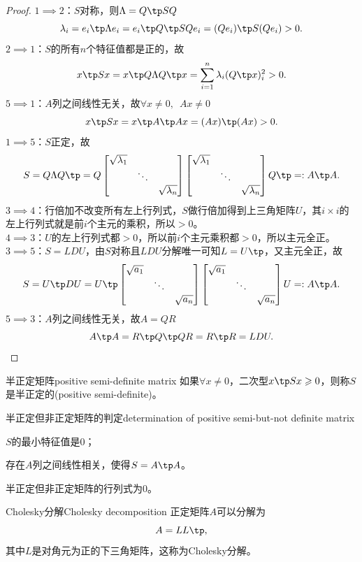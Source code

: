 \begin{proof}
	$1\implies 2$：$S$对称，则$\Lambda=Q\tp SQ$
	\[
		\lambda_i=e_i\tp \Lambda e_i=e_i\tp Q\tp SQe_i=(Qe_i)\tp S(Qe_i)>0.
	\]
	$2\implies 1$：$S$的所有$n$个特征值都是正的，故
	\[
		x\tp Sx=x\tp Q\Lambda Q\tp x=\sum_{i=1}^n\lambda_i(Q\tp x)^2_i>0.
	\]
	$5\implies 1$：$A$列之间线性无关，故$\forall x\neq 0,\enspace Ax\neq 0$
	\[
		x\tp Sx=x\tp A\tp Ax=(Ax)\tp(Ax)>0.
	\]
	$1\implies 5$：$S$正定，故
	\[
		S=Q\Lambda Q\tp=Q\begin{bmatrix}
			\sqrt{\lambda_1}\\ &\ddots\\ &&\sqrt{\lambda_n}
		\end{bmatrix}\begin{bmatrix}
			\sqrt{\lambda_1}\\ &\ddots\\ &&\sqrt{\lambda_n}
		\end{bmatrix}Q\tp=:A\tp A.
	\]
	$3\implies 4$：行倍加不改变所有左上行列式，$S$做行倍加得到上三角矩阵$U$，其$i\times i$的左上行列式就是前$i$个主元的乘积，所以$>0$。\\
	$4\implies 3$：$U$的左上行列式都$>0$，所以前$i$个主元乘积都$>0$，所以主元全正。\\
	$3\implies 5$：$S=LDU$，由$S$对称且$LDU$分解唯一可知$L=U\tp$，又主元全正，故
	\[
		S=U\tp DU=U\tp\begin{bmatrix}
			\sqrt{a_1}\\ &\ddots\\ &&\sqrt{a_n}
		\end{bmatrix}\begin{bmatrix}
			\sqrt{a_1}\\ &\ddots\\ &&\sqrt{a_n}
		\end{bmatrix}U=:A\tp A.
	\]
	$5\implies 3$：$A$列之间线性无关，故$A=QR$
	\[
		A\tp A=R\tp Q\tp QR=R\tp R=LDU.
		\qedhere
	\]
\end{proof}
\begin{definition}{半正定矩阵}{positive semi-definite matrix}
	如果$\forall x\neq 0$，二次型$x\tp Sx\geqslant 0$，则称$S$是半正定的(positive semi-definite)。
\end{definition}
\begin{theorem}{半正定但非正定矩阵的判定}{determination of positive semi-but-not definite matrix}
	\begin{compactenum}
		\item $S$的最小特征值是0；
		\item 存在$A$列之间线性相关，使得$S=A\tp A$。
	\end{compactenum}
\end{theorem}
\begin{corollary}
	半正定但非正定矩阵的行列式为0。
\end{corollary}

\begin{theorem}
	{Cholesky分解}{Cholesky decomposition}
	正定矩阵$A$可以分解为
	\begin{equation}
		A=LL\tp,
	\end{equation}
	其中$L$是对角元为正的下三角矩阵，这称为Cholesky分解。
\end{theorem}


